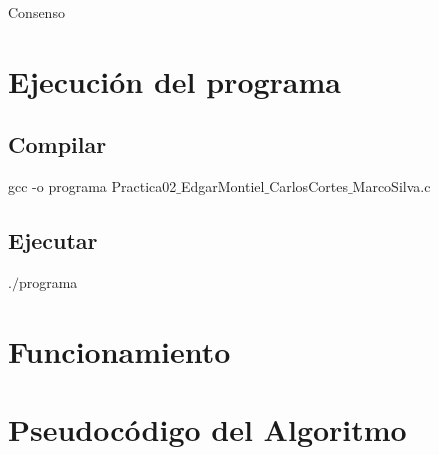 \documentclass[a4paper,12pt]{article}
\begin{document}

\newpage

\newpage

\begin{center}
    {\huge Consenso}
\end{center}

\section*{Ejecución del programa}

\subsection*{Compilar}
\begin{center}
    gcc -o programa Practica02$\_$EdgarMontiel$\_$CarlosCortes$\_$MarcoSilva.c
\end{center}

\subsection*{Ejecutar}
\begin{center}
    $.\slash$programa
\end{center}

\section*{Funcionamiento}




\section*{Pseudocódigo del Algoritmo}
\end{document}
